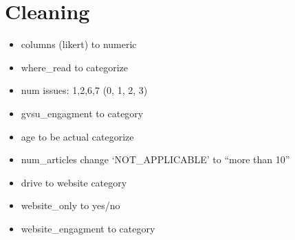 \documentclass[
]{article}
\providecommand{\tightlist}{%
  \setlength{\itemsep}{0pt}\setlength{\parskip}{0pt}}
\begin{document}
\hypertarget{cleaning}{%
\section{Cleaning}\label{cleaning}}

\begin{itemize}
\tightlist
\item
  columns (likert) to numeric
\item
  where\_read to categorize
\item
  num issues: 1,2,6,7 (0, 1, 2, 3)
\item
  gvsu\_engagment to category
\item
  age to be actual categorize
\item
  num\_articles change `NOT\_APPLICABLE' to ``more than 10''
\item
  drive to website category
\item
  website\_only to yes/no
\item
  website\_engagment to category
\end{itemize}
\end{document}
